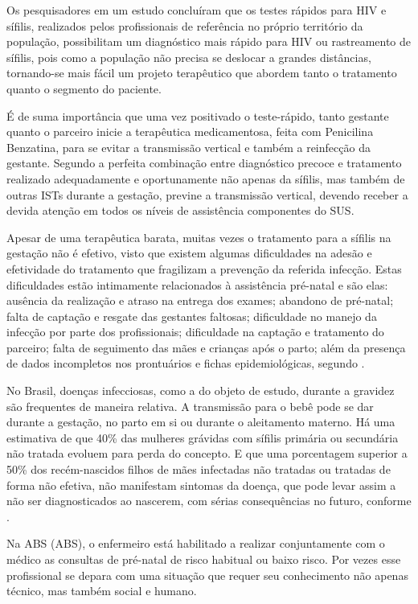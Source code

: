 Os pesquisadores \cite{bagatini2016teste} em um estudo concluíram que os testes rápidos para HIV e sífilis, realizados pelos profissionais de referência no próprio território da população, possibilitam um diagnóstico mais rápido para HIV ou rastreamento de sífilis, pois como a população não precisa se deslocar a grandes distâncias, tornando-se mais fácil um projeto terapêutico que abordem tanto o tratamento quanto o segmento do paciente.

É de suma importância que uma vez positivado o teste-rápido, tanto gestante quanto o parceiro inicie a terapêutica medicamentosa, feita com Penicilina Benzatina, para se evitar a transmissão vertical e também a reinfecção da gestante. Segundo \cite{brasil2015protocolo} a perfeita combinação entre diagnóstico precoce e tratamento realizado adequadamente e oportunamente não apenas da sífilis, mas também de outras ISTs durante a gestação, previne a transmissão vertical, devendo receber a devida atenção em todos os níveis de assistência componentes do SUS.

Apesar de uma terapêutica barata, muitas vezes o tratamento para a sífilis na gestação não é efetivo, visto que existem algumas dificuldades na adesão e efetividade do tratamento que fragilizam a prevenção da referida infecção. Estas dificuldades estão intimamente relacionados à assistência pré-natal e são elas: ausência da realização e atraso na entrega dos exames; abandono de pré-natal; falta de captação e resgate das gestantes faltosas; dificuldade no manejo da infecção por parte dos profissionais; dificuldade na captação e tratamento do parceiro; falta de seguimento das mães e crianças após o parto; além da presença de dados incompletos nos prontuários e fichas epidemiológicas, segundo \cite{cardoso2018analise}.

No Brasil, doenças infecciosas, como a do objeto de estudo, durante a gravidez são frequentes de maneira relativa. A transmissão para o bebê pode se dar durante a gestação, no parto em si ou durante o aleitamento materno. Há uma estimativa de que 40\% das mulheres grávidas com sífilis primária ou secundária não tratada evoluem para perda do concepto. E que uma porcentagem superior a 50\% dos recém-nascidos filhos de mães infectadas não tratadas ou tratadas de forma não efetiva, não manifestam sintomas da doença, que pode levar assim a não ser diagnosticados ao nascerem, com sérias consequências no futuro, conforme \cite{rodrigues2016elementos}.

Na \acrlong{ABS} (\acrshort{ABS}), o enfermeiro está habilitado a realizar conjuntamente com o médico as consultas de pré-natal de risco habitual ou baixo risco. Por vezes esse profissional se depara com uma situação que requer seu conhecimento não apenas técnico, mas também social e humano.

